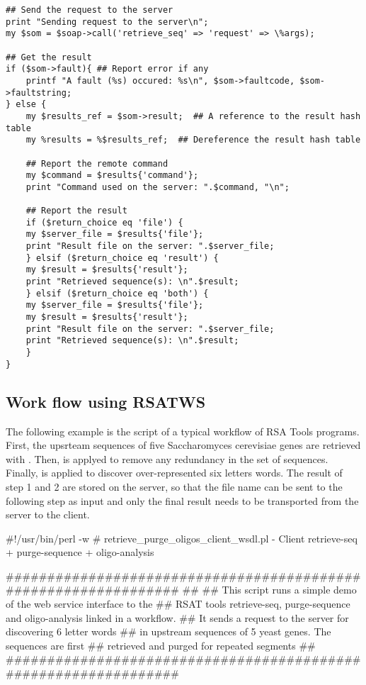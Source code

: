 \begin{footnotesize}
\begin{verbatim}
## Send the request to the server
print "Sending request to the server\n";
my $som = $soap->call('retrieve_seq' => 'request' => \%args);

## Get the result
if ($som->fault){ ## Report error if any
    printf "A fault (%s) occured: %s\n", $som->faultcode, $som->faultstring;
} else {
    my $results_ref = $som->result;  ## A reference to the result hash table
    my %results = %$results_ref;  ## Dereference the result hash table

    ## Report the remote command
    my $command = $results{'command'};
    print "Command used on the server: ".$command, "\n";

    ## Report the result
    if ($return_choice eq 'file') {
	my $server_file = $results{'file'};
	print "Result file on the server: ".$server_file;
    } elsif ($return_choice eq 'result') {
	my $result = $results{'result'};
	print "Retrieved sequence(s): \n".$result;
    } elsif ($return_choice eq 'both') {
	my $server_file = $results{'file'};
	my $result = $results{'result'};
	print "Result file on the server: ".$server_file;
	print "Retrieved sequence(s): \n".$result;
    }
}
\end{verbatim}
\end{footnotesize}

\subsection{Work flow using RSATWS}

The following example is the script of a typical workflow of RSA Tools
programs. First, the upsrteam sequences of five Saccharomyces
cerevisiae genes are retrieved with . Then,
 is applyed to remove any redundancy in the
set of sequences. Finally,  is applied to
discover over-represented six letters words. The result of step 1 and
2 are stored on the server, so that the file name can be sent to the
following step as input and only the final result needs to be
transported from the server to the client.

#!/usr/bin/perl -w
# retrieve_purge_oligos_client_wsdl.pl - Client retrieve-seq + purge-sequence + oligo-analysis

################################################################
##
## This script runs a simple demo of the web service interface to the
## RSAT tools retrieve-seq, purge-sequence and oligo-analysis linked in a workflow.
##  It sends a request to the server for discovering 6 letter words
## in upstream sequences of 5 yeast genes. The sequences are first
## retrieved and purged for repeated segments
##
################################################################

